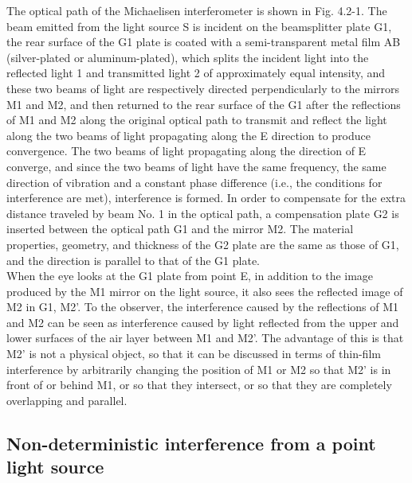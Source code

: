 \documentclass[UTF8]{article}
\begin{document}
The optical path of the Michaelisen interferometer is shown in Fig. 4.2-1. The beam emitted from the light source S is incident on the beamsplitter plate G1, the rear surface of the G1 plate is coated with a semi-transparent metal film AB (silver-plated or aluminum-plated), which splits the incident light into the reflected light 1 and transmitted light 2 of approximately equal intensity, and these two beams of light are respectively directed perpendicularly to the mirrors M1 and M2, and then returned to the rear surface of the G1 after the reflections of M1 and M2 along the original optical path to transmit and reflect the light along the two beams of light propagating along the E direction to produce convergence. The two beams of light propagating along the direction of E converge, and since the two beams of light have the same frequency, the same direction of vibration and a constant phase difference (i.e., the conditions for interference are met), interference is formed. In order to compensate for the extra distance traveled by beam No. 1 in the optical path, a compensation plate G2 is inserted between the optical path G1 and the mirror M2. The material properties, geometry, and thickness of the G2 plate are the same as those of G1, and the direction is parallel to that of the G1 plate.\\
 
 When the eye looks at the G1 plate from point E, in addition to the image produced by the M1 mirror on the light source, it also sees the reflected image of M2 in G1, M2'. To the observer, the interference caused by the reflections of M1 and M2 can be seen as interference caused by light reflected from the upper and lower surfaces of the air layer between M1 and M2'. The advantage of this is that M2' is not a physical object, so that it can be discussed in terms of thin-film interference by arbitrarily changing the position of M1 or M2 so that M2' is in front of or behind M1, or so that they intersect, or so that they are completely overlapping and parallel.

   \subsection{Non-deterministic interference from a point light source}
\end{document}
